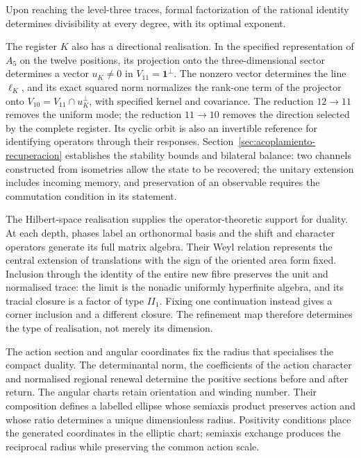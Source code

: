 Upon reaching the level-three
traces, formal factorization of the rational identity determines
divisibility at every degree, with its optimal exponent.

The register \(K\) also has a directional realisation.
In the specified representation of \(A_5\) on the twelve positions,
its projection onto the three-dimensional sector determines a vector
\(u_K\ne0\) in \(V_{11}=\mathbf1^\perp\).
The nonzero vector determines the line \(\ell_K\), and its exact squared
norm normalizes the rank-one term of the projector onto
\(V_{10}=V_{11}\cap u_K^\perp\), with specified
kernel and covariance. The reduction \(12\to11\) removes the uniform
mode; the reduction \(11\to10\) removes the direction selected by
the complete register. Its cyclic orbit is also an invertible reference
for identifying operators through their responses.
Section~\ref{sec:acoplamiento-recuperacion} establishes the stability
bounds and bilateral balance: two channels constructed from isometries allow the state
to be recovered; the unitary extension includes incoming memory,
and preservation of an observable requires the commutation condition
in its statement.

The Hilbert-space realisation supplies the operator-theoretic support
for duality. At each depth, phases label an orthonormal basis and the
shift and character operators generate its full matrix algebra.
Their Weyl relation represents the central extension of translations
with the sign of the oriented area form fixed. Inclusion through the
identity of the entire new fibre preserves the unit and normalised
trace: the limit is the nonadic uniformly hyperfinite algebra, and
its tracial closure is a factor of type \(II_1\). Fixing one
continuation instead gives a corner inclusion and a different closure.
The refinement map therefore determines the type of realisation,
not merely its dimension.

The action section and angular coordinates fix the radius that
specialises the compact duality. The determinantal norm, the coefficients
of the action character and normalised regional renewal determine the
positive sections before and after return. The angular charts retain
orientation and winding number. Their composition defines a labelled
ellipse whose semiaxis product preserves action and whose ratio
determines a unique dimensionless radius. Positivity conditions place
the generated coordinates in the elliptic chart; semiaxis exchange
produces the reciprocal radius while preserving the common action scale.

